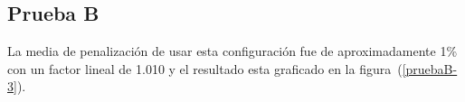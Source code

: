 
\subsection{Prueba B}

La media de penalización de usar esta configuración fue de aproximadamente 1\% con un factor lineal de 1.010 y el resultado esta graficado en la figura~(\ref{pruebaB-3}).





